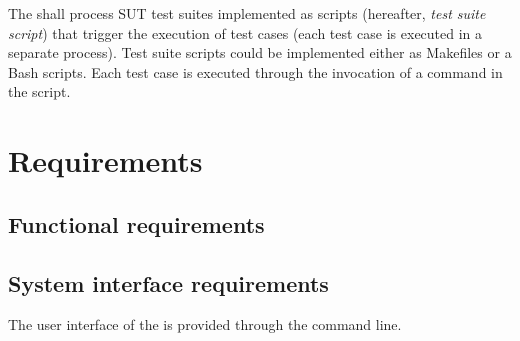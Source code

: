\RQ{} The \FAQAS shall process SUT test suites implemented as scripts (hereafter, \emph{test suite script}) that trigger the execution of test cases (each test case is executed in a separate process). Test suite scripts could be implemented either as Makefiles or a Bash scripts. Each test case is executed through the invocation of a command in the script.



\chapter{Requirements}

\section{Functional requirements}
\label{sec:requirements}






\section{System interface requirements}

\RQ{} The user interface of the \FAQAS is provided through the command line.

